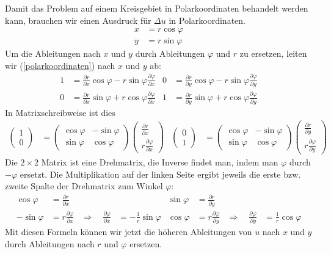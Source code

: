 Damit das Problem auf einem Kreisgebiet in Polarkoordinaten behandelt
werden kann,
brauchen wir einen Ausdruck für $\Delta u$ in Polarkoordinaten.
\begin{align}
x&=r\cos\varphi\\
y&=r\sin\varphi
\label{polarkoordinaten}
\end{align}
Um die Ableitungen nach $x$ und $y$ durch Ableitungen $\varphi$ und $r$ zu
ersetzen, leiten wir (\ref{polarkoordinaten}) nach $x$ und $y$ ab:
\begin{align*}
1&=
\frac{\partial r}{\partial x}\cos\varphi
-r\sin\varphi \frac{\partial\varphi}{\partial x}
&
0&=
\frac{\partial r}{\partial y}\cos\varphi
-r\sin\varphi \frac{\partial\varphi}{\partial y}
\\
0&=
\frac{\partial r}{\partial x}\sin\varphi
+r\cos\varphi \frac{\partial\varphi}{\partial x}
&
1&=
\frac{\partial r}{\partial y}\sin\varphi
+r\cos\varphi \frac{\partial\varphi}{\partial y}
\end{align*}
In Matrixschreibweise ist dies
\begin{align*}
\begin{pmatrix}1\\0\end{pmatrix}
&=
\begin{pmatrix}
\cos\varphi&-\sin\varphi\\
\sin\varphi&\cos\varphi
\end{pmatrix}
\begin{pmatrix}
\frac{\partial r}{\partial x}\\
r\frac{\partial \varphi}{\partial x}
\end{pmatrix}
&
\begin{pmatrix}0\\1\end{pmatrix}
&=
\begin{pmatrix}
\cos\varphi&-\sin\varphi\\
\sin\varphi&\cos\varphi
\end{pmatrix}
\begin{pmatrix}
\frac{\partial r}{\partial y}\\
r\frac{\partial \varphi}{\partial y}
\end{pmatrix}
\end{align*}
Die $2\times2$ Matrix ist eine Drehmatrix, die Inverse findet man, indem man
$\varphi$ durch $-\varphi$ ersetzt. Die Multiplikation auf der linken Seite
ergibt jeweils die erste bzw. zweite Spalte der Drehmatrix zum
Winkel $\varphi$:
\begin{align*}
\cos\varphi
&=\frac{\partial r}{\partial x}
&&
&
\sin\varphi
&=
\frac{\partial r}{\partial y}
&&
\\
-\sin\varphi
&=r\frac{\partial \varphi}{\partial x}
&\Rightarrow\quad
\frac{\partial\varphi}{\partial x}&=-\frac1r\sin\varphi
&
\cos\varphi
&=
r\frac{\partial\varphi}{\partial y}
&\Rightarrow\quad
\frac{\partial\varphi}{\partial y}&=\frac1r\cos\varphi
\end{align*}
Mit diesen Formeln können wir jetzt die höheren Ableitungen
von $u$ nach  $x$ und $y$ durch Ableitungen nach $r$ und $\varphi$
ersetzen.

